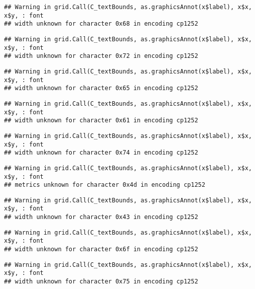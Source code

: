 \documentclass[
]{article}
\begin{document}
\begin{verbatim}
## Warning in grid.Call(C_textBounds, as.graphicsAnnot(x$label), x$x, x$y, : font
## width unknown for character 0x68 in encoding cp1252
\end{verbatim}

\begin{verbatim}
## Warning in grid.Call(C_textBounds, as.graphicsAnnot(x$label), x$x, x$y, : font
## width unknown for character 0x72 in encoding cp1252
\end{verbatim}

\begin{verbatim}
## Warning in grid.Call(C_textBounds, as.graphicsAnnot(x$label), x$x, x$y, : font
## width unknown for character 0x65 in encoding cp1252
\end{verbatim}

\begin{verbatim}
## Warning in grid.Call(C_textBounds, as.graphicsAnnot(x$label), x$x, x$y, : font
## width unknown for character 0x61 in encoding cp1252
\end{verbatim}

\begin{verbatim}
## Warning in grid.Call(C_textBounds, as.graphicsAnnot(x$label), x$x, x$y, : font
## width unknown for character 0x74 in encoding cp1252
\end{verbatim}

\begin{verbatim}
## Warning in grid.Call(C_textBounds, as.graphicsAnnot(x$label), x$x, x$y, : font
## metrics unknown for character 0x4d in encoding cp1252
\end{verbatim}

\begin{verbatim}
## Warning in grid.Call(C_textBounds, as.graphicsAnnot(x$label), x$x, x$y, : font
## width unknown for character 0x43 in encoding cp1252
\end{verbatim}

\begin{verbatim}
## Warning in grid.Call(C_textBounds, as.graphicsAnnot(x$label), x$x, x$y, : font
## width unknown for character 0x6f in encoding cp1252
\end{verbatim}

\begin{verbatim}
## Warning in grid.Call(C_textBounds, as.graphicsAnnot(x$label), x$x, x$y, : font
## width unknown for character 0x75 in encoding cp1252
\end{verbatim}
\end{document}
